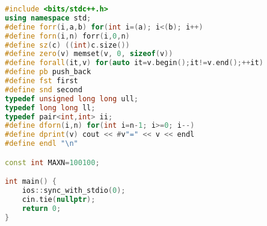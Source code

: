 \begin{lstlisting}[language=C++]
#include <bits/stdc++.h>
using namespace std;
#define forr(i,a,b) for(int i=(a); i<(b); i++)
#define forn(i,n) forr(i,0,n)
#define sz(c) ((int)c.size())
#define zero(v) memset(v, 0, sizeof(v))
#define forall(it,v) for(auto it=v.begin();it!=v.end();++it)
#define pb push_back
#define fst first
#define snd second
typedef unsigned long long ull;
typedef long long ll;
typedef pair<int,int> ii;
#define dforn(i,n) for(int i=n-1; i>=0; i--)
#define dprint(v) cout << #v"=" << v << endl
#define endl "\n"

const int MAXN=100100;

int main() {
    ios::sync_with_stdio(0);
    cin.tie(nullptr);
	return 0;
}
\end{lstlisting}
